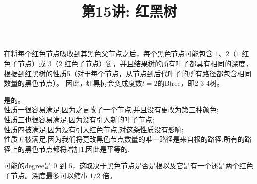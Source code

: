 \documentclass[a4paper, justified]{tufte-handout}
\title{第15讲: 红黑树}
\date{\zhtoday} %
\begin{document}
\maketitle
\noplagiarism %
\begin{abstract}
\end{abstract}
\beginrequired

\begin{problem}[TC 18.1-5]
\end{problem}

\begin{solution}
  在将每个红色节点吸收到其黑色父节点之后，每个黑色节点可能包含 $1、2$（$1$ 红色子节点）或 $3$（$2$ 红色子节点）键，并且结果树的所有叶子都具有相同的深度，根据到红黑树的性质5（对于每个节点，从节点到后代叶子的所有路径都包含相同数量的黑色节点）。 因此，红黑树会变成度数$t = 2$的Btree，即2-3-4树。
\end{solution}

\begin{problem}[TC 13.1-5]
\end{problem}

\begin{solution}
  是的。\\
  性质一很容易满足,因为之更改了一个节点,并且没有更改为第三种颜色;\\
  性质三也很容易满足,因为没有引入新的叶子节点;\\
  性质四被满足,因为没有引入红色节点,对这条性质没有影响;\\
  性质五被满足,因为我们将更改黑色节点数量的唯一路径是来自根的路径.所有的路径上的黑色节点都将增加1,因此是平等的.
\end{solution}

\begin{problem}[TC 13.1-7]
\end{problem}

\begin{solution}
  可能的degree是 $0$ 到 $5$，这取决于黑色节点是否是根以及它是有一个还是两个红色子节点。深度最多可以缩小 $1 / 2$ 倍。
\end{solution}
\end{document}
